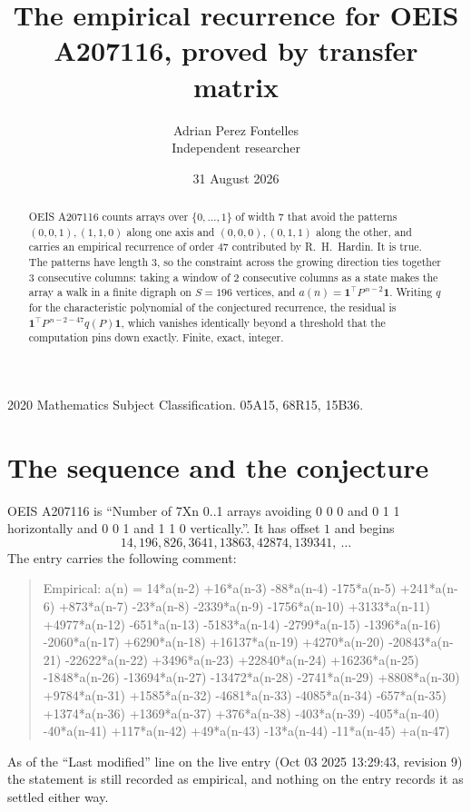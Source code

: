 \documentclass[11pt,a4paper]{article}
\title{The empirical recurrence for OEIS A207116, proved by transfer matrix}
\author{Adrian Perez Fontelles\\ \small Independent researcher}
\date{31 August 2026}
\theoremstyle{plain}
\theoremstyle{definition}
\begin{document}
\maketitle

\begin{abstract}
OEIS A207116 counts arrays over $\{0,\dots,1\}$ of width $7$ that avoid the patterns
$(0,0,1), (1,1,0)$ along one axis and $(0,0,0), (0,1,1)$ along the other, and carries an empirical recurrence of
order $47$ contributed by R.~H.~Hardin. It is true. The patterns have length $3$, so
the constraint across the growing direction ties together $3$ consecutive columns: taking a
window of $2$ consecutive columns as a state makes the array a walk in a finite digraph
on $S=196$ vertices, and $a(n)=\mathbf{1}^{\!\top}P^{\,n-2}\mathbf{1}$. Writing $q$
for the characteristic polynomial of the conjectured recurrence, the residual is
$\mathbf{1}^{\!\top}P^{\,n-2-47}q(P)\mathbf{1}$, which vanishes identically
beyond a threshold that the computation pins down exactly. Finite, exact, integer.
\end{abstract}

\noindent\small 2020 Mathematics Subject Classification. 05A15, 68R15, 15B36.\normalsize

\section{The sequence and the conjecture}

OEIS A207116 is ``Number of 7Xn 0..1 arrays avoiding 0 0 0 and 0 1 1 horizontally and 0 0 1 and 1 1 0 vertically.''. It has offset
$1$ and begins
\[
14, 196, 826, 3641, 13863, 42874, 139341,\ \dots
\]
The entry carries the following comment:
\begin{quote}\small
Empirical: a(n) = 14*a(n-2) +16*a(n-3) -88*a(n-4) -175*a(n-5) +241*a(n-6) +873*a(n-7) -23*a(n-8) -2339*a(n-9) -1756*a(n-10) +3133*a(n-11) +4977*a(n-12) -651*a(n-13) -5183*a(n-14) -2799*a(n-15) -1396*a(n-16) -2060*a(n-17) +6290*a(n-18) +16137*a(n-19) +4270*a(n-20) -20843*a(n-21) -22622*a(n-22) +3496*a(n-23) +22840*a(n-24) +16236*a(n-25) -1848*a(n-26) -13694*a(n-27) -13472*a(n-28) -2741*a(n-29) +8808*a(n-30) +9784*a(n-31) +1585*a(n-32) -4681*a(n-33) -4085*a(n-34) -657*a(n-35) +1374*a(n-36) +1369*a(n-37) +376*a(n-38) -403*a(n-39) -405*a(n-40) -40*a(n-41) +117*a(n-42) +49*a(n-43) -13*a(n-44) -11*a(n-45) +a(n-47)
\end{quote}
As of the ``Last modified'' line on the live entry (Oct 03 2025 13:29:43, revision
9) the statement is still recorded as empirical, and nothing on the entry
records it as settled either way.
\end{document}
